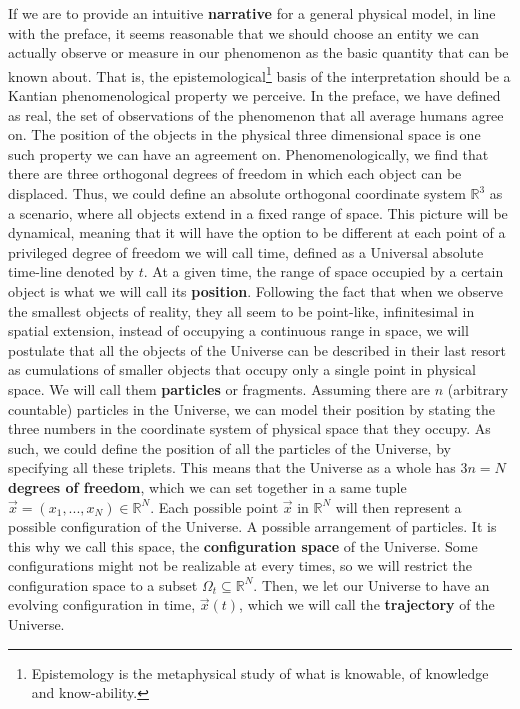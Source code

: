 \documentclass[11pt, a4paper]{article} %
\newcommand{\R}{\mathbb{R}} %
\begin{document}
If we are to provide an intuitive {\bf narrative} for a general physical model, in line with the preface, it seems reasonable that we should choose an entity we can actually observe or measure in our phenomenon as the basic quantity that can be known about. That is, the epistemological\footnote{Epistemology is the metaphysical study of what is knowable, of knowledge and know-ability.} basis of the interpretation should be a Kantian phenomenological property we perceive. In the preface, we have defined as real, the set of observations of the phenomenon that all average humans agree on. The position of the objects in the physical three dimensional space is one such property we can have an agreement on. Phenomenologically, we find that there are three orthogonal degrees of freedom in which each object can be displaced. Thus, we could define an absolute orthogonal coordinate system $\R^3$ as a scenario, where all objects extend in a fixed range of space. This picture will be dynamical, meaning that it will have the option to be different at each point of a privileged degree of freedom we will call time, defined as a Universal absolute time-line denoted by $t$. At a given time, the range of space occupied by a certain object is what we will call its {\bf position}. Following the fact that when we observe the smallest objects of reality, they all seem to be point-like, infinitesimal in spatial extension, instead of occupying a continuous range in space, we will postulate that all the objects of the Universe can be described in their last resort as cumulations of smaller objects that occupy only a single point in physical space. We will call them {\bf particles} or fragments. Assuming there are $n$ (arbitrary countable) particles in the Universe, we can model their position by stating the three numbers in the coordinate system of physical space that they occupy. As such, we could define the position of all the particles of the Universe, by specifying all these triplets. This means that the Universe as a whole has $3n=N$ {\bf degrees of freedom}, which we can set together in a same tuple $\vec{x}=(x_1,...,x_N)\in \R^N$. Each possible point $\vec{x}$ in $\R^N$ will then represent a possible configuration of the Universe. A possible arrangement of particles. It is this why we call this space, the {\bf configuration space} of the Universe. Some configurations might not be realizable at every times, so we will restrict the configuration space to a subset $\Omega_t\subseteq \R^N$. Then, we let our Universe to have an evolving configuration in time, $\vec{x}(t)$, which we will call the {\bf trajectory} of the Universe.
\end{document}
